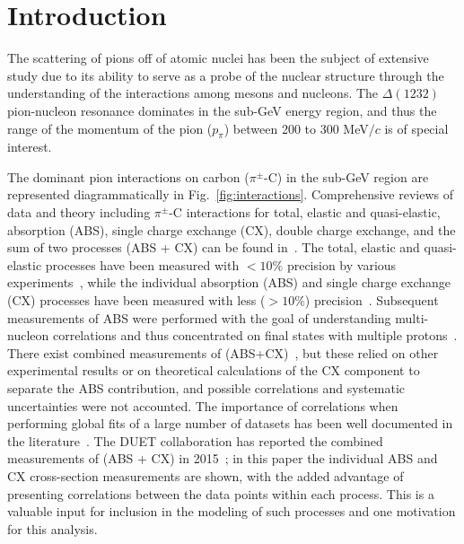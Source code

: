 \section{\label{sec:intro}Introduction\protect}
The scattering of pions off of atomic nuclei has been the subject of extensive study
due to its ability to serve as a probe of the nuclear structure 
through the understanding of the interactions among mesons and nucleons. The $\Delta(1232)$ pion-nucleon resonance dominates in the sub-GeV energy region, and thus the range of the momentum of the pion ($p_{\pi}$) between 200 to 300 MeV$/c$ is of special interest.


The dominant pion interactions on carbon ($\pi^{\pm}$-C) in the sub-GeV region are represented diagrammatically in Fig.~\ref{fig:interactions}. Comprehensive reviews of data and theory including $\pi^{\pm}$-C interactions for total, elastic and quasi-elastic, absorption (ABS), single charge exchange (CX), double charge exchange, and the sum of two processes (ABS + CX) can be found in~\cite{review1,review2}. The total, elastic and quasi-elastic processes have been measured with $<10\%$ precision by various experiments~\cite{Allardyce,Binon,Gelderloos,Meirav,Moinester,Levenson,Ashery,Saunders1996,Jones1993}, while the individual absorption (ABS) and single charge exchange (CX) processes have been measured with less ($>10\%$) precision~\cite{Jones1993,Ashery2,Hilscher,Bowles,Bellotti1973,Bellotti1973_2}. Subsequent measurements of ABS were performed with the goal of understanding multi-nucleon correlations and thus concentrated on final states with multiple protons~\cite{Ransome1992,Jones1993,Gianelli2000}. There exist combined measurements of (ABS+CX)~\cite{Saunders1996,Ashery,Miller,navon,navon2}, but these relied on other experimental results or on theoretical calculations of the CX component to separate the ABS contribution, and possible correlations and systematic uncertainties were not accounted. The importance of correlations when performing global fits of a large number of datasets has been well documented in the literature~\cite{Pumplin,Stump,niwgPaper}. The DUET collaboration has reported the combined measurements of (ABS + CX) in 2015~\cite{duet}; in this paper the individual ABS and CX cross-section measurements are shown, with the added advantage of presenting correlations between the data points within each process. This is a valuable input for inclusion in the modeling of such processes and one motivation for this analysis.

